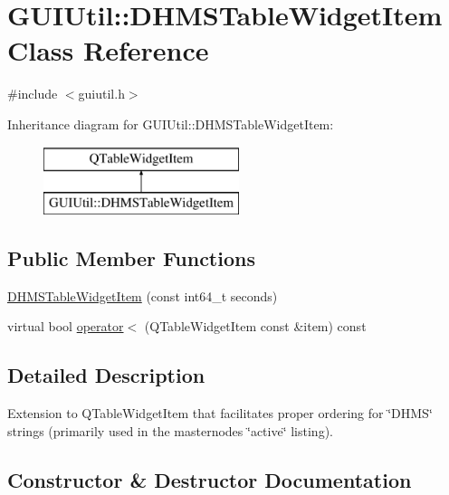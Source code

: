\hypertarget{class_g_u_i_util_1_1_d_h_m_s_table_widget_item}{}\section{G\+U\+I\+Util\+:\+:D\+H\+M\+S\+Table\+Widget\+Item Class Reference}
\label{class_g_u_i_util_1_1_d_h_m_s_table_widget_item}


{\ttfamily \#include $<$guiutil.\+h$>$}

Inheritance diagram for G\+U\+I\+Util\+:\+:D\+H\+M\+S\+Table\+Widget\+Item\+:\begin{figure}[H]
\begin{center}
\leavevmode
\includegraphics[height=2.000000cm]{class_g_u_i_util_1_1_d_h_m_s_table_widget_item}
\end{center}
\end{figure}
\subsection*{Public Member Functions}
\begin{DoxyCompactItemize}
\item 
\mbox{\hyperlink{class_g_u_i_util_1_1_d_h_m_s_table_widget_item_a048ab36b7b4d8ec6af77bca7fd547f95}{D\+H\+M\+S\+Table\+Widget\+Item}} (const int64\+\_\+t seconds)
\item 
virtual bool \mbox{\hyperlink{class_g_u_i_util_1_1_d_h_m_s_table_widget_item_ab386d4d66b8eb16a216ddaf73d1799fa}{operator$<$}} (Q\+Table\+Widget\+Item const \&item) const
\end{DoxyCompactItemize}


\subsection{Detailed Description}
Extension to Q\+Table\+Widget\+Item that facilitates proper ordering for \char`\"{}\+D\+H\+M\+S\char`\"{} strings (primarily used in the masternode\textquotesingle{}s \char`\"{}active\char`\"{} listing). 

\subsection{Constructor \& Destructor Documentation}
\mbox{\label{class_g_u_i_util_1_1_d_h_m_s_table_widget_item_a048ab36b7b4d8ec6af77bca7fd547f95}} 
